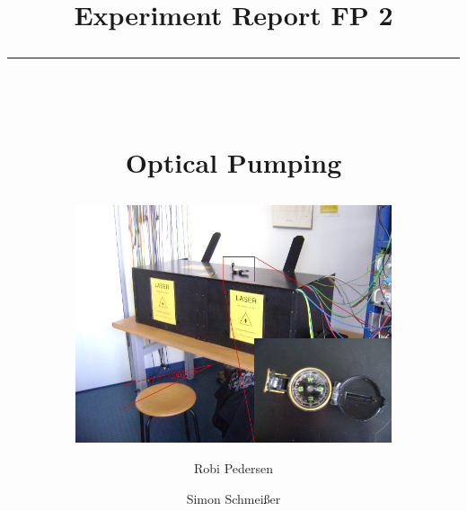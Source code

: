 \documentclass[a4paper,oneside]{scrartcl} %
\title{Experiment Report FP 2\\
\rule{0.5\textwidth}{0.4pt}\\
\vspace*{1cm}
\begin{Huge}
Optical Pumping
\end{Huge}
}
\subtitle{\vspace*{1cm}
\includegraphics[width=0.7\textwidth]{BilderAusw/Nordsued.png}
\vspace*{1.5cm}}
\author{Robi Pedersen \and Simon Schmeißer}
\date{Versuchsdurchführung 21.03. - 03.04.2011
\vspace*{1cm}\\
\rule{0.8\textwidth}{0.4pt}\\
Physikalisches Institut, Albert-Ludwigs-Universität Freiburg
}
\begin{document}
\begin{titlepage}
  \maketitle
  \vfill
  \thispagestyle{empty}
\end{titlepage}

\renewcommand*\contentsname{Table Of Contents}
\tableofcontents
\clearpage









% 
%
\end{document}
